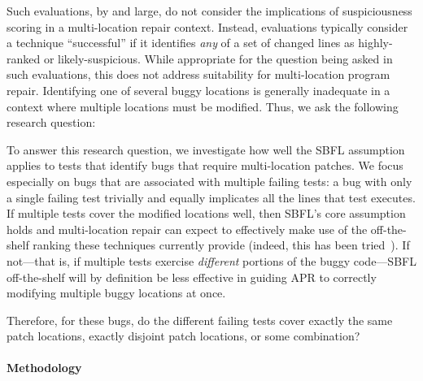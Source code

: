 Such evaluations, by and large, do not consider the implications of
suspiciousness scoring in a multi-location repair context.  Instead, evaluations
typically consider a technique ``successful'' if it identifies \emph{any} of a
set of changed lines as highly-ranked or likely-suspicious.  While appropriate
for the question being asked in such evaluations, this does not address
suitability for multi-location program repair.  Identifying one of several buggy
locations is generally inadequate in a context where multiple locations must be
modified. Thus, we ask the following research question:



To answer this research question, we investigate how well the SBFL assumption
applies to tests that identify bugs that require multi-location patches. We
focus especially on bugs that are associated with multiple failing tests: a bug
with only a single failing test trivially and equally implicates all the lines
that test executes.  If multiple tests cover the modified locations well, then
SBFL's core assumption holds and multi-location repair can expect to effectively
make use of the off-the-shelf ranking these techniques currently provide
(indeed, this has been tried~\cite{angelix}). If not---that is, if multiple
tests exercise \emph{different} portions of the buggy code---SBFL off-the-shelf
will by definition be less effective in guiding APR to correctly modifying
multiple buggy locations at once.

Therefore, for these bugs, do the different failing tests cover exactly the same
patch locations, exactly disjoint patch locations, or some combination?

\paragraph{Methodology}

